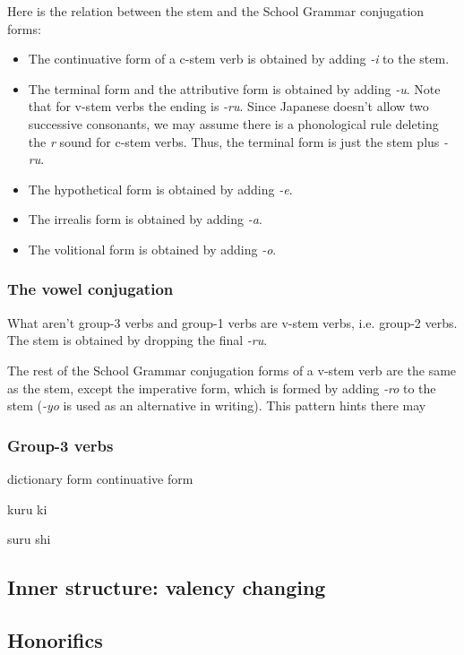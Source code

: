 \documentclass[UTF8, a4paper, oneside, scheme=plain]{ctexart}
\newcommand{\corpus}[1]{\emph{#1}}
\begin{document}
Here is the relation between the stem and the School Grammar conjugation forms:
\begin{itemize}
    \item The continuative form of a c-stem verb is obtained by adding \corpus{-i} to the stem.
    \item The terminal form and the attributive form is obtained by adding \corpus{-u}.
    Note that for v-stem verbs the ending is \corpus{-ru}.
    Since Japanese doesn't allow two successive consonants,
    we may assume there is a phonological rule deleting the \corpus{r} sound for c-stem verbs.
    Thus, the terminal form is just the stem plus \corpus{-ru}.
    \item The hypothetical form is obtained by adding \corpus{-e}.
    \item The irrealis form is obtained by adding \corpus{-a}.
    \item The volitional form is obtained by adding \corpus{-o}.
\end{itemize}

\subsubsection{The vowel conjugation}\label{sec:vowel-class}

What aren't group-3 verbs and group-1 verbs are v-stem verbs, i.e. group-2 verbs.
The stem is obtained by dropping the final \corpus{-ru}.

The rest of the School Grammar conjugation forms of a v-stem verb are the same as the stem,
except the imperative form,
which is formed by adding \corpus{-ro} to the stem 
(\corpus{-yo} is used as an alternative in writing).
This pattern hints there may 

\subsubsection{Group-3 verbs}

dictionary form continuative form 

kuru ki 

suru shi

\subsection{Inner structure: valency changing}



\subsection{Honorifics}
\end{document}

